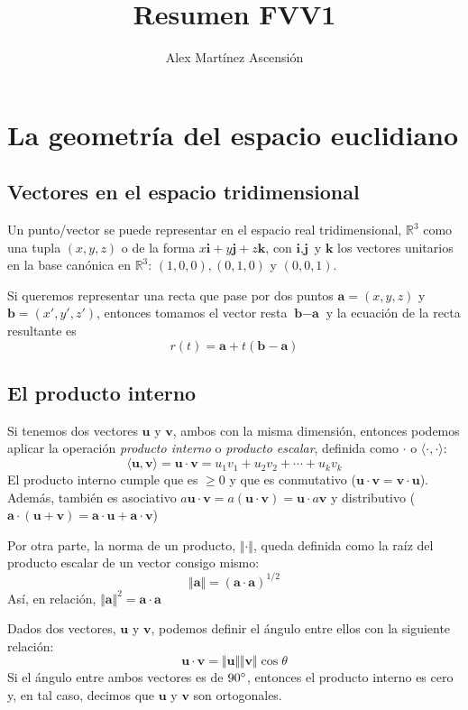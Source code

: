 \documentclass[a4paper]{article}
\title{\Huge{\vspace{-1em}Resumen FVV1}}
\author{\Large{\vspace{-1em}Alex Mart\'inez Ascensi\'on}}
\begin{document}
	\maketitle
	

\section{La geometría del espacio euclidiano}
\subsection{Vectores en el espacio tridimensional}
Un punto/vector se puede representar en el espacio real tridimensional, $\mathbb{R}^3$ como una tupla $(x,y,z)$ o de la forma $x\textbf{i}+y\textbf{j}+z\textbf{k}$, con $\textbf{i}, \textbf{j}$ y $\textbf{k}$ los vectores unitarios en la base canónica en $\mathbb{R}^3$: $(1,0,0), (0,1,0)$ y $(0,0,1)$. 

Si queremos representar una recta que pase por dos puntos $\textbf{a} = (x,y,z)$ y $\textbf{b} = (x', y', z')$, entonces tomamos el vector resta $\textbf{b}-\textbf{a}$ y la ecuación de la recta resultante es \[r(t) = \textbf{a} + t(\textbf{b}-\textbf{a})\]

\subsection{El producto interno}
Si tenemos dos vectores $\textbf{u}$ y $\textbf{v}$, ambos con la misma dimensión, entonces podemos aplicar la operación \textit{producto interno} o \textit{producto escalar}, definida como \textbf{$\cdot$} o $\langle\cdot,\cdot\rangle$: \[\langle\textbf{u},\textbf{v}\rangle=\textbf{u}\cdot \textbf{v}=u_1v_1+u_2v_2+\cdots+u_kv_k\] 
El producto interno cumple que es $\ge0$ y que es conmutativo ($\textbf{u}\cdot \textbf{v}=\textbf{v}\cdot\textbf{u}$). Además, también es asociativo $a\textbf{u}\cdot\textbf{v} = a(\textbf{u}\cdot\textbf{v}) = \textbf{u}\cdot a\textbf{v}$ y distributivo ($\textbf{a}\cdot(\textbf{u}+\textbf{v}) = \textbf{a}\cdot \textbf{u}+\textbf{a}\cdot \textbf{v}$)

Por otra parte, la norma de un producto, $\Vert\cdot\Vert$, queda definida como la raíz del producto escalar de un vector consigo mismo:
\[\Vert \textbf{a} \Vert = (\textbf{a}\cdot\textbf{a})^{1/2} \]
Así, en relación, $\Vert \textbf{a} \Vert^2= \textbf{a}\cdot\textbf{a} $

Dados dos vectores, $\textbf{u}$ y $\textbf{v}$, podemos definir el ángulo entre ellos con la siguiente relación: \[ \textbf{u} \cdot \textbf{v} = \Vert\textbf{u}\Vert \Vert\textbf{v}\Vert \cos\theta \]
Si el ángulo entre ambos vectores es de $90\degree$, entonces el producto interno es cero y, en tal caso, decimos que $\textbf{u}$ y $\textbf{v}$ son ortogonales.
\end{document}

